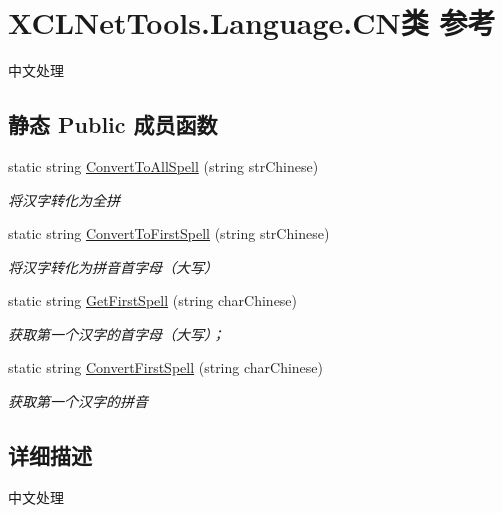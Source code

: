 \hypertarget{class_x_c_l_net_tools_1_1_language_1_1_c_n}{\section{X\-C\-L\-Net\-Tools.\-Language.\-C\-N类 参考}
\label{class_x_c_l_net_tools_1_1_language_1_1_c_n}
}


中文处理  


\subsection*{静态 Public 成员函数}
\begin{DoxyCompactItemize}
\item 
static string \hyperlink{class_x_c_l_net_tools_1_1_language_1_1_c_n_a298b6a886b268ba4f667304e25cf5c93}{Convert\-To\-All\-Spell} (string str\-Chinese)
\begin{DoxyCompactList}\small\item\em 将汉字转化为全拼 \end{DoxyCompactList}\item 
static string \hyperlink{class_x_c_l_net_tools_1_1_language_1_1_c_n_adad5709d68f61a8cb7002ce6abf72c54}{Convert\-To\-First\-Spell} (string str\-Chinese)
\begin{DoxyCompactList}\small\item\em 将汉字转化为拼音首字母（大写） \end{DoxyCompactList}\item 
static string \hyperlink{class_x_c_l_net_tools_1_1_language_1_1_c_n_ae8a020bfe3d0b396edb88d8529decb29}{Get\-First\-Spell} (string char\-Chinese)
\begin{DoxyCompactList}\small\item\em 获取第一个汉字的首字母（大写）； \end{DoxyCompactList}\item 
static string \hyperlink{class_x_c_l_net_tools_1_1_language_1_1_c_n_ac25cb893e8f56ae3ce28a04f4665c51d}{Convert\-First\-Spell} (string char\-Chinese)
\begin{DoxyCompactList}\small\item\em 获取第一个汉字的拼音 \end{DoxyCompactList}\end{DoxyCompactItemize}


\subsection{详细描述}
中文处理 



